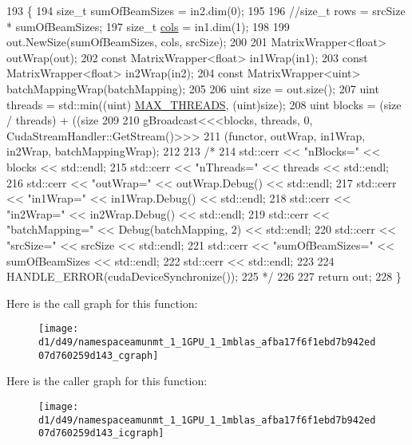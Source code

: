 \begin{DoxyCode}
193 \{
194   \textcolor{keywordtype}{size\_t} sumOfBeamSizes = in2.dim(0);
195 
196   \textcolor{comment}{//size\_t rows = srcSize * sumOfBeamSizes;}
197   \textcolor{keywordtype}{size\_t} \hyperlink{namespacemarian_ab9fbdcc76cc853270094524572584222}{cols}  = in1.dim(1);
198 
199   out.NewSize(sumOfBeamSizes, cols, srcSize);
200 
201   MatrixWrapper<float> outWrap(out);
202   \textcolor{keyword}{const} MatrixWrapper<float> in1Wrap(in1);
203   \textcolor{keyword}{const} MatrixWrapper<float> in2Wrap(in2);
204   \textcolor{keyword}{const} MatrixWrapper<uint> batchMappingWrap(batchMapping);
205 
206   uint size = out.size();
207   uint threads = std::min((uint) \hyperlink{matrix__functions_8h_a8b5173357adb02a86c027316e0acdfa0}{MAX\_THREADS}, (uint)size);
208   uint blocks  = (size / threads) + ((size %
209 
210   gBroadcast<<<blocks, threads, 0, CudaStreamHandler::GetStream()>>>
211     (functor, outWrap, in1Wrap, in2Wrap, batchMappingWrap);
212 
213   \textcolor{comment}{/*}
214 \textcolor{comment}{  std::cerr << "nBlocks=" << blocks << std::endl;}
215 \textcolor{comment}{  std::cerr << "nThreads=" << threads << std::endl;}
216 \textcolor{comment}{  std::cerr << "outWrap=" << outWrap.Debug() << std::endl;}
217 \textcolor{comment}{  std::cerr << "in1Wrap=" << in1Wrap.Debug() << std::endl;}
218 \textcolor{comment}{  std::cerr << "in2Wrap=" << in2Wrap.Debug() << std::endl;}
219 \textcolor{comment}{  std::cerr << "batchMapping=" << Debug(batchMapping, 2) << std::endl;}
220 \textcolor{comment}{  std::cerr << "srcSize=" << srcSize << std::endl;}
221 \textcolor{comment}{  std::cerr << "sumOfBeamSizes=" << sumOfBeamSizes << std::endl;}
222 \textcolor{comment}{  std::cerr << std::endl;}
223 \textcolor{comment}{}
224 \textcolor{comment}{  HANDLE\_ERROR(cudaDeviceSynchronize());}
225 \textcolor{comment}{  */}
226 
227   \textcolor{keywordflow}{return} out;
228 \}
\end{DoxyCode}


Here is the call graph for this function\+:
\nopagebreak
\begin{figure}[H]
\begin{center}
\leavevmode
\texttt{[image: d1/d49/namespaceamunmt\_1\_1GPU\_1\_1mblas\_afba17f6f1ebd7b942ed07d760259d143\_cgraph]}
\end{center}
\end{figure}




Here is the caller graph for this function\+:
\nopagebreak
\begin{figure}[H]
\begin{center}
\leavevmode
\texttt{[image: d1/d49/namespaceamunmt\_1\_1GPU\_1\_1mblas\_afba17f6f1ebd7b942ed07d760259d143\_icgraph]}
\end{center}
\end{figure}


